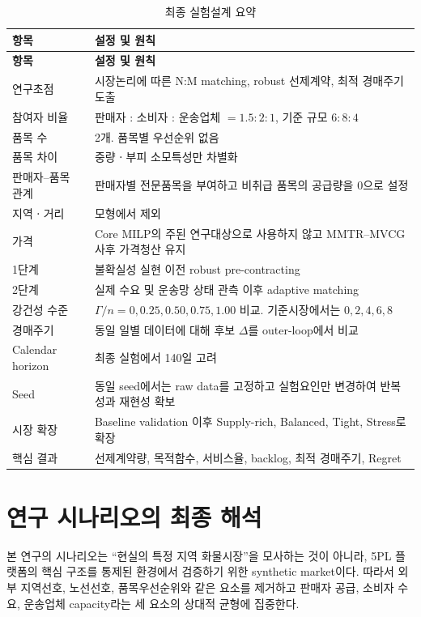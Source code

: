 \documentclass[11pt,a4paper]{article}
\begin{document}
\begin{longtable}{p{}p{}}
\caption{최종 실험설계 요약} \\
\toprule
\textbf{항목} & \textbf{설정 및 원칙} \\
\midrule
\endfirsthead
\toprule
\textbf{항목} & \textbf{설정 및 원칙} \\
\midrule
\endhead

연구초점 & 시장논리에 따른 N:M matching, robust 선제계약, 최적 경매주기 도출 \\
참여자 비율 & 판매자 : 소비자 : 운송업체 $=1.5:2:1$, 기준 규모 $6:8:4$ \\
품목 수 & 2개. 품목별 우선순위 없음 \\
품목 차이 & 중량ㆍ부피 소모특성만 차별화 \\
판매자--품목 관계 & 판매자별 전문품목을 부여하고 비취급 품목의 공급량을 0으로 설정 \\
지역ㆍ거리 & 모형에서 제외 \\
가격 & Core MILP의 주된 연구대상으로 사용하지 않고 MMTR--MVCG 사후 가격청산 유지 \\
1단계 & 불확실성 실현 이전 robust pre-contracting \\
2단계 & 실제 수요 및 운송망 상태 관측 이후 adaptive matching \\
강건성 수준 & $\Gamma/n=0,0.25,0.50,0.75,1.00$ 비교. 기준시장에서는 $0,2,4,6,8$ \\
경매주기 & 동일 일별 데이터에 대해 후보 $\Delta$를 outer-loop에서 비교 \\
Calendar horizon & 최종 실험에서 140일 고려 \\
Seed & 동일 seed에서는 raw data를 고정하고 실험요인만 변경하여 반복성과 재현성 확보 \\
시장 확장 & Baseline validation 이후 Supply-rich, Balanced, Tight, Stress로 확장 \\
핵심 결과 & 선제계약량, 목적함수, 서비스율, backlog, 최적 경매주기, Regret \\
\bottomrule
\end{longtable}

\section{연구 시나리오의 최종 해석}

본 연구의 시나리오는 ``현실의 특정 지역 화물시장''을 모사하는 것이 아니라,
5PL 플랫폼의 핵심 구조를 통제된 환경에서 검증하기 위한 synthetic market이다.
따라서 외부 지역선호, 노선선호, 품목우선순위와 같은 요소를 제거하고
판매자 공급, 소비자 수요, 운송업체 capacity라는 세 요소의 상대적 균형에 집중한다.
\end{document}
